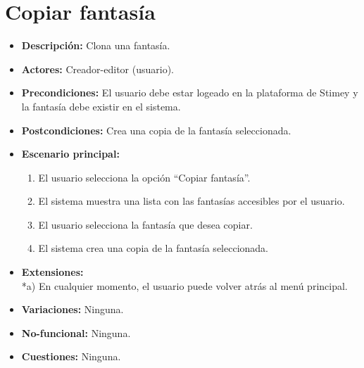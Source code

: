 \documentclass[12pt,letterpaper]{article}
\begin{document}
\section{Copiar fantasía}
\begin{itemize}
	\item \textbf{Descripción:} Clona una fantasía.
	\item \textbf{Actores:} Creador-editor (usuario).
	\item \textbf{Precondiciones:} El usuario debe estar logeado en la plataforma de Stimey y la fantasía debe existir en el sistema.
	\item \textbf{Postcondiciones:} Crea una copia de la fantasía seleccionada.
	\item \textbf{Escenario principal:}
	\begin{enumerate}
		\item El usuario selecciona la opción ``Copiar fantasía''.
		\item El sistema muestra una lista con las fantasías accesibles por el usuario.
		\item El usuario selecciona la fantasía que desea copiar.
		\item El sistema crea una copia de la fantasía seleccionada.
	\end{enumerate}
	\item \textbf{Extensiones:} \\ *a) En cualquier momento, el usuario puede volver atrás al menú principal.
	\item \textbf{Variaciones:} Ninguna.
	\item \textbf{No-funcional:} Ninguna.
	\item \textbf{Cuestiones:} Ninguna.
\end{itemize}
\end{document}
